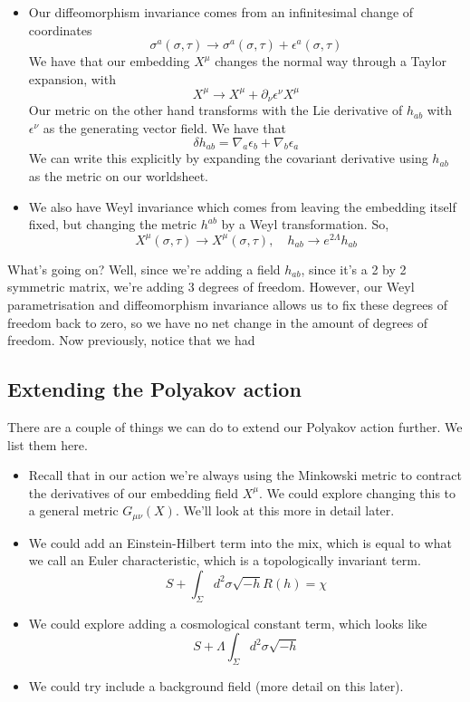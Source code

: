 \documentclass[11pt, oneside]{article}   	%
\theoremstyle{slanted}
\begin{document}
\begin{itemize}
	\item Our diffeomorphism invariance 
		comes from an infinitesimal change of coordinates 
		\[
		 \sigma ^ a \left( \sigma, \tau  \right)  \to 
		 \sigma ^a \left( \sigma, \tau  \right)  + \epsilon ^ a \left( \sigma, \tau  \right)  
		\] We have that our embedding $ X ^ \mu$ changes 
		the normal way through a Taylor expansion, with 
		\[
		X ^ \mu \to X ^ \mu + \partial _ \nu \epsilon ^ \nu X ^ \mu 
		\] Our metric on the other hand transforms 
		with the Lie derivative of $ h _{ ab } $ 
		with $ \epsilon ^ \nu $ as the generating vector field. 
		We have that 
		\[
		 \delta h _{ ab }  = \nabla _ a \epsilon _ b 
		 + \nabla _ b \epsilon _ a  
		\] We can write this explicitly by expanding the 
		covariant derivative using $ h _{ ab } $ as 
		the metric on our worldsheet.
	\item We also have Weyl invariance 
		which comes from leaving the 
		embedding itself fixed, but 
		changing the metric $ h ^{ ab } $ by 
		a Weyl transformation. 
		So, 
		\[
		 X^ \mu \left( \sigma, \tau  \right)  \to 
		 X ^ \mu \left( \sigma, \tau  \right), 
		 \quad h _{ ab } \to e ^{ 2 \Lambda } h _{ ab } 
		\]  
\end{itemize}
What's going on? Well, since we're adding a field $ h _{ ab } $, 
since it's a 2 by 2 symmetric matrix, we're 
adding 3 degrees of freedom. 
However, our Weyl parametrisation and diffeomorphism invariance 
allows us to fix these degrees of freedom back to zero, 
so we have no net change in the amount of degrees of freedom. 
Now previously, notice that we 
had 

\subsection{Extending the Polyakov action}
There are a couple of things we can do 
to extend our Polyakov action further. 
We list them here. 
\begin{itemize}
	\item Recall that in our action 
		we're always using the Minkowski metric to 
		contract the derivatives of our embedding 
		field $ X ^ \mu $. 
		We could explore changing this to a general 
		metric $ G_{ \mu \nu }\left( X \right) $. 
		We'll look at this more in detail later.
	\item We could add an Einstein-Hilbert term 
		into the mix, which is 
		equal to what we call an Euler characteristic, 
		which is a topologically invariant term. 
		\[
		 S + \int_{ \Sigma } d ^ 2 \sigma 
		 \sqrt{ - h }   R\left( h  \right)   = \chi
		\] 
	\item We could explore adding a cosmological 
		constant term, which looks like 
		\[
		 S + \Lambda \int _{ \Sigma } d ^ 2 \sigma \sqrt{ - h }  
		\] 
	\item We could try include a background field 
		(more detail on this later). 
\end{itemize}
\end{document}
